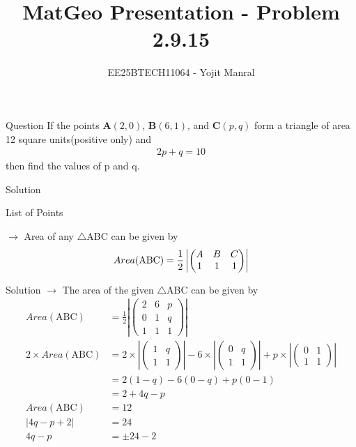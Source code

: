 \documentclass{beamer}
\title{MatGeo Presentation - Problem 2.9.15}
\author{EE25BTECH11064 - Yojit Manral}
\date{}
\numberwithin{equation}{section}
\providecommand{\brak}[1]{\ensuremath{\left(#1\right)}}
\theoremstyle{remark}
\newcommand{\myvec}[1]{\ensuremath{\begin{pmatrix}#1\end{pmatrix}}}
\let\vec\mathbf
\begin{document}
\frame{\titlepage}
\begin{frame}{Question}
If the points $\vec{A}\brak{2,0}$, $\vec{B}\brak{6,1}$, and $\vec{C}\brak{p,q}$ form a triangle of area 12 square units(positive only) and
\begin{align}
    2p + q = 10
\end{align}
then find the values of p and q.
\end{frame}

\begin{frame}{Solution}
\begin{table}[h!]    
  \centering
  
  \caption{List of Points}
  \label{Table_1}
\end{table}
$\rightarrow$ Area of any $\triangle$ABC can be given by
\begin{align}
    Area(\text{ABC}) = \frac{1}{2} \left| \myvec{A & B & C\\1 & 1 & 1} \right| \notag
\end{align}
\end{frame}

\begin{frame}{Solution} 
$\rightarrow$ The area of the given $\triangle$ABC can be given by
\begin{align}
    Area(\text{ABC}) &= \frac{1}{2} \left| \myvec{2 & 6 & p\\0& 1 & q\\1 & 1 & 1} \right| \\
    2 \times Area(\text{ABC}) &= 2 \times \left| \myvec{1 & q\\1 & 1} \right| - 6 \times \left| \myvec{0 & q\\1 & 1} \right| + p \times \left| \myvec{0 & 1\\1 & 1} \right| \\
    &= 2(1-q) - 6(0-q) + p(0-1) \\
    &= 2 + 4q - p \\
    Area(\text{ABC}) &= 12 \\
    \left| 4q -p + 2 \right| &= 24 \\
    4q - p &= \pm 24 - 2
\end{align}
\end{frame}
\end{document}
